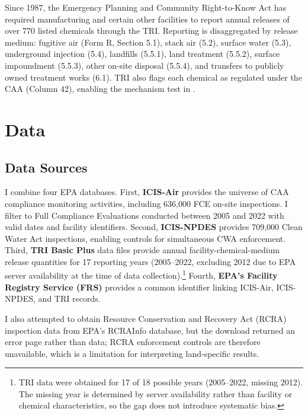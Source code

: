 \documentclass[12pt]{article}
\begin{document}
Since 1987, the Emergency Planning and Community Right-to-Know Act has required manufacturing and certain other facilities to report annual releases of over 770 listed chemicals through the TRI. Reporting is disaggregated by release medium: fugitive air (Form R, Section 5.1), stack air (5.2), surface water (5.3), underground injection (5.4), landfills (5.5.1), land treatment (5.5.2), surface impoundment (5.5.3), other on-site disposal (5.5.4), and transfers to publicly owned treatment works (6.1). TRI also flags each chemical as regulated under the CAA (Column 42), enabling the mechanism test in .


\section{Data}
\label{sec:data}

\subsection{Data Sources}

I combine four EPA databases. First, \textbf{ICIS-Air} provides the universe of CAA compliance monitoring activities, including 636,000 FCE on-site inspections. I filter to Full Compliance Evaluations conducted between 2005 and 2022 with valid dates and facility identifiers. Second, \textbf{ICIS-NPDES} provides 709,000 Clean Water Act inspections, enabling controls for simultaneous CWA enforcement. Third, \textbf{TRI Basic Plus} data files provide annual facility-chemical-medium release quantities for 17 reporting years (2005--2022, excluding 2012 due to EPA server availability at the time of data collection).\footnote{TRI data were obtained for 17 of 18 possible years (2005--2022, missing 2012). The missing year is determined by server availability rather than facility or chemical characteristics, so the gap does not introduce systematic bias.} Fourth, \textbf{EPA's Facility Registry Service (FRS)} provides a common identifier linking ICIS-Air, ICIS-NPDES, and TRI records.

I also attempted to obtain Resource Conservation and Recovery Act (RCRA) inspection data from EPA's RCRAInfo database, but the download returned an error page rather than data; RCRA enforcement controls are therefore unavailable, which is a limitation for interpreting land-specific results.
\end{document}
